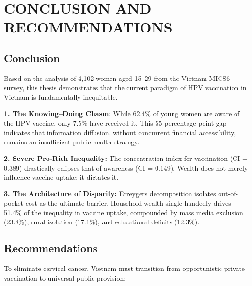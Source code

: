 \chapter*{CONCLUSION AND RECOMMENDATIONS}
{}

\section*{Conclusion}

Based on the analysis of 4,102 women aged 15--29 from the Vietnam MICS6 survey, this thesis demonstrates that the current paradigm of HPV vaccination in Vietnam is fundamentally inequitable.

\textbf{1. The Knowing--Doing Chasm:} While 62.4\% of young women are aware of the HPV vaccine, only 7.5\% have received it. This 55-percentage-point gap indicates that information diffusion, without concurrent financial accessibility, remains an insufficient public health strategy.

\textbf{2. Severe Pro-Rich Inequality:} The concentration index for vaccination (CI = 0.389) drastically eclipses that of awareness (CI = 0.149). Wealth does not merely influence vaccine uptake; it dictates it. 

\textbf{3. The Architecture of Disparity:} Erreygers decomposition isolates out-of-pocket cost as the ultimate barrier. Household wealth single-handedly drives 51.4\% of the inequality in vaccine uptake, compounded by mass media exclusion (23.8\%), rural isolation (17.1\%), and educational deficits (12.3\%).

\section*{Recommendations}

To eliminate cervical cancer, Vietnam must transition from opportunistic private vaccination to universal public provision:

